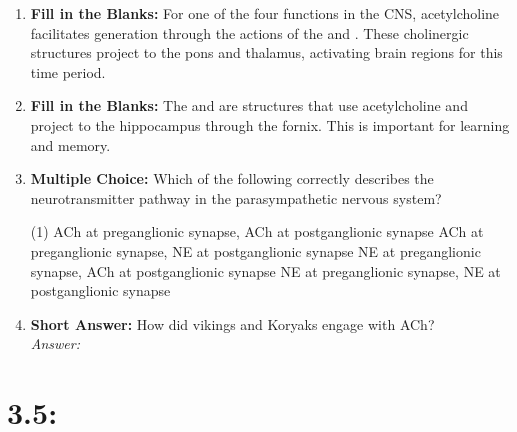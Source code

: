 \begin{enumerate}[label=\textbf{Q3.4.\arabic*}]
    \item \textbf{Fill in the Blanks:} For one of the four functions in the CNS, acetylcholine facilitates \underline{\hspace{3cm}} \underline{\hspace{3cm}} generation through the actions of the \underline{\hspace{3cm}} and \underline{\hspace{3cm}}. These cholinergic structures project to the pons and thalamus, activating brain regions for this time period.

    \item \textbf{Fill in the Blanks:} The \underline{\hspace{3cm}} and \underline{\hspace{3cm}} are structures that use acetylcholine and project to the hippocampus through the fornix. This is important for learning and memory.

    \item \textbf{Multiple Choice:} Which of the following correctly describes the neurotransmitter pathway in the parasympathetic nervous system?
        \begin{tasks}[label=\textcolor{\documentTheme}{(\Alph*)}, item-format=\color{\documentTheme}, label-width=1.5em, item-indent=1.7em](1)
            \task ACh at preganglionic synapse, ACh at postganglionic synapse
            \task ACh at preganglionic synapse, NE at postganglionic synapse
            \task NE at preganglionic synapse, ACh at postganglionic synapse
            \task NE at preganglionic synapse, NE at postganglionic synapse
        \end{tasks}

    \item \textbf{Short Answer:} How did vikings and Koryaks engage with ACh? \\
        \textit{Answer:} %
\end{enumerate}

\squigglyline
\section*{3.5: %
}


